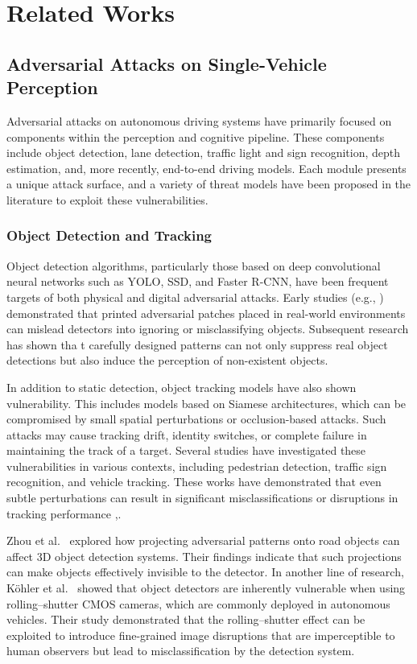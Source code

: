 \chapter{Related Works}
\label{related-works}


\section{Adversarial Attacks on Single-Vehicle Perception}

Adversarial attacks on autonomous driving systems have primarily focused on components within the perception and cognitive pipeline. 
These components include object detection, lane detection, traffic light and sign recognition, depth estimation, and, more recently, end-to-end driving models. 
Each module presents a unique attack surface, and a variety of threat models have been proposed in the literature to exploit these vulnerabilities.

\subsection{Object Detection and Tracking}
Object detection algorithms, particularly those based on deep convolutional neural networks such as YOLO, SSD, and Faster R-CNN, have been frequent targets of both physical and digital adversarial attacks. 
Early studies (e.g., \cite{DBLP:journalscorrabs-1712-09665}) demonstrated that printed adversarial patches placed in real-world environments can mislead detectors into ignoring or misclassifying objects. 
Subsequent research has shown tha t carefully designed patterns can not only suppress real object detections but also induce the perception of non-existent objects.

In addition to static detection, object tracking models have also shown vulnerability. 
This includes models based on Siamese architectures, which can be compromised by small spatial perturbations or occlusion-based attacks. 
Such attacks may cause tracking drift, identity switches, or complete failure in maintaining the track of a target. 
Several studies have investigated these vulnerabilities in various contexts, including pedestrian detection, traffic sign recognition, and vehicle tracking. 
These works have demonstrated that even subtle perturbations can result in significant misclassifications or disruptions in tracking performance \cite{10.11453372297.3423359},\cite{10.11453548606.3559390}.

Zhou et al.\ \cite{zhou2024transientadversarial3dprojection} explored how projecting adversarial patterns onto road objects can affect 3D object detection systems. 
Their findings indicate that such projections can make objects effectively invisible to the detector. In another line of research, Köhler et al.\ \cite{köhler2021rollininherentvulnerabilityrolling} showed that object detectors are inherently vulnerable when using rolling–shutter CMOS cameras, which are commonly deployed in autonomous vehicles. 
Their study demonstrated that the rolling–shutter effect can be exploited to introduce fine-grained image disruptions that are imperceptible to human observers but lead to misclassification by the detection system.

